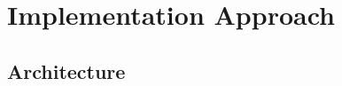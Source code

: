 \chapter{Implementation Approach}
\label{chap:implementation}



\section{Architecture} \label{sec:Arch}



